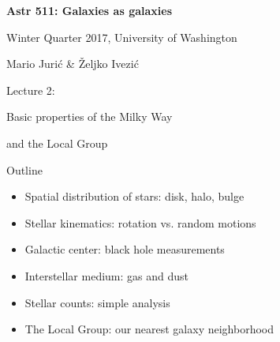\documentclass[letterpaper,landscape]{slides}
\begin{document}
\newcommand{\Spicslide}[7]{%
  \begin{slide}
     \begin{center}
        \begin{minipage}{#5in}
            \vskip #6in
            \hskip #7in
            {\scalebox{#4}{\texttt{[image: \#1.\#2]}}}
        \end{minipage}
     \end{center}
     \vfill
  \end{slide}
}
 


\begin{slide}

\phantom{x}
\vskip -2in
\begin{center}
\bfseries
{\large {\color{blue} Astr 511: Galaxies as galaxies}}
\end{center}

{\centerline {{\color{blue} 
Winter Quarter 2017, University of Washington}}}
{\centerline {{\color{blue} 
Mario Juri\'{c} \& \v{Z}eljko Ivezi\'{c} }}}

\vskip 1.6in

{\centerline {\huge {\color{red}      Lecture 2:             }}}
\vskip 0.2in 
{\centerline {\Large {\color{blue} Basic properties of the Milky Way }}}
{\centerline {\Large {\color{blue} and the Local Group  }}}

\vfill
\end{slide}


\begin{slide}
\begin{center}
{\large \color{red} 
                         Outline
}
\end{center}

\begin{itemize}
\item {\color{blue} Spatial distribution of stars:} disk, halo, bulge
\item {\color{blue} Stellar kinematics:} rotation vs. random motions
\item {\color{blue} Galactic center:} black hole measurements
\item {\color{blue} Interstellar medium:} gas and dust
\item {\color{blue} Stellar counts:} simple analysis
\item {\color{blue} The Local Group:} our nearest galaxy neighborhood 

\end{itemize}          


\vfill
\end{slide}
\end{document}
